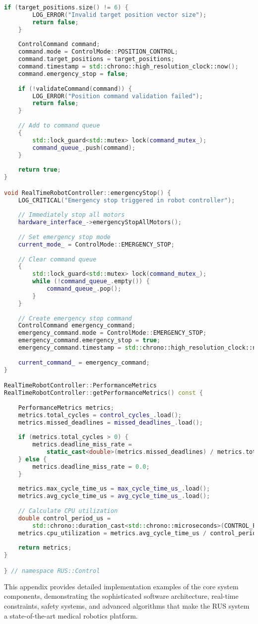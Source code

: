 \begin{lstlisting}[language=C++, caption={Real-Time Robot Controller}, label={lst:app-realtime-controller}]
    if (target_positions.size() != 6) {
        LOG_ERROR("Invalid target position vector size");
        return false;
    }
    
    ControlCommand command;
    command.mode = ControlMode::POSITION_CONTROL;
    command.target_positions = target_positions;
    command.timestamp = std::chrono::high_resolution_clock::now();
    command.emergency_stop = false;
    
    if (!validateCommand(command)) {
        LOG_ERROR("Position command validation failed");
        return false;
    }
    
    // Add to command queue
    {
        std::lock_guard<std::mutex> lock(command_mutex_);
        command_queue_.push(command);
    }
    
    return true;
}

void RealTimeRobotController::emergencyStop() {
    LOG_CRITICAL("Emergency stop triggered in robot controller");
    
    // Immediately stop all motors
    hardware_interface_->emergencyStopAllMotors();
    
    // Set emergency stop mode
    current_mode_ = ControlMode::EMERGENCY_STOP;
    
    // Clear command queue
    {
        std::lock_guard<std::mutex> lock(command_mutex_);
        while (!command_queue_.empty()) {
            command_queue_.pop();
        }
    }
    
    // Create emergency stop command
    ControlCommand emergency_command;
    emergency_command.mode = ControlMode::EMERGENCY_STOP;
    emergency_command.emergency_stop = true;
    emergency_command.timestamp = std::chrono::high_resolution_clock::now();
    
    current_command_ = emergency_command;
}

RealTimeRobotController::PerformanceMetrics 
RealTimeRobotController::getPerformanceMetrics() const {
    
    PerformanceMetrics metrics;
    metrics.total_cycles = control_cycles_.load();
    metrics.missed_deadlines = missed_deadlines_.load();
    
    if (metrics.total_cycles > 0) {
        metrics.deadline_miss_rate = 
            static_cast<double>(metrics.missed_deadlines) / metrics.total_cycles;
    } else {
        metrics.deadline_miss_rate = 0.0;
    }
    
    metrics.max_cycle_time_us = max_cycle_time_us_.load();
    metrics.avg_cycle_time_us = avg_cycle_time_us_.load();
    
    // Calculate CPU utilization
    double control_period_us = 
        std::chrono::duration_cast<std::chrono::microseconds>(CONTROL_PERIOD).count();
    metrics.cpu_utilization = metrics.avg_cycle_time_us / control_period_us;
    
    return metrics;
}

} // namespace RUS::Control
\end{lstlisting}

This appendix provides detailed implementation examples of the core system components, demonstrating the sophisticated software architecture, real-time constraints, safety systems, and advanced algorithms that make the RUS system a state-of-the-art medical robotics platform.
